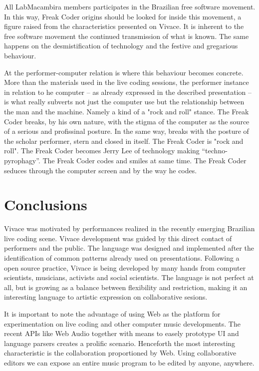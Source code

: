 \documentclass[letterpaper, 12pt]{article}
\begin{document}
All LabMacambira members participates in the Brazilian free software
movement. In this way, Freak Coder origins should be looked for inside
this movement, a figure raised from the characteristics presented on
Vivace. It is inherent to the free software movement the continued
transmission of what is known. The same happens on the
desmistification of technology and the festive and gregarious
behaviour.

At the performer-computer relation is where this behaviour becomes
concrete. More than the materials used in the live coding sessions,
the performer instance in relation to he computer -- as already
expressed in the described presentation -- is what really subverts not
just the computer use but the relationship between the man and the
machine. Namely a kind of a "rock and roll" stance. The Freak Coder
breaks, by his own nature, with the stigma of the computer as the
source of a serious and profissinal posture. In the same way, breaks
with the posture of the scholar performer, stern and closed in
itself. The Freak Coder is "rock and roll". The Freak Coder becomes
Jerry Lee of technology making ``techno-pyrophagy''. The Freak Coder
codes and smiles at same time. The Freak Coder seduces through the
computer screen and by the way he codes.

\section{Conclusions}

Vivace was motivated by performances realized in the recently emerging
Brazilian live coding scene. Vivace development was guided by this
direct contact of performers and the public. The language was designed
and implemented after the identification of common patterns already
used on presentations. Following a open source practice, Vivace is
being developed by many hands from computer scientists, musicians,
activists and social scientists. The language is not perfect at all,
but is growing as a balance between flexibility and restriction,
making it an interesting language to artistic expression on
collaborative sesions.

It is important to note the advantage of using Web as the platform for
experimentation on live coding and other computer music
developments. The recent APIs like Web Audio together with means to
easely prototype UI and language parsers creates a prolific
scenario. Henceforth the most interesting characteristic is the
collaboration proportioned by Web. Using collaborative editors we can
expose an entire music program to be edited by anyone, anywhere.
\end{document}
